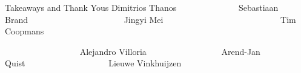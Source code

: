 \begin{refsection}
\begin{frame}{Takeaways and Thank Yous}
\footnotesize
Dimitrios Thanos~~~~~~~~~~~~~~
Sebastiaan Brand~~~~~~~~~~~~~~~~~~~~~~ 
Jingyi Mei~~~~~~~~~~~~~~~~~~~~~~~~~~~
Tim Coopmans

\vspace{-2ex}
~~~~~~~~~~~~~~~~~
Alejandro Villoria~~~~~~~~~~~~~~~~~
Arend-Jan Quist~~~~~~~~~~~~~~~~~~~
Lieuwe Vinkhuijzen


\vspace{-1em}



%



\printbibliography[section=\therefsection]
\end{frame}
\end{refsection}




